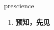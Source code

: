 
\begin{frame}
{\huge prescience}
\begin{center}
\begin{enumerate}\Large
  \item \textbf{预知，先见}
\end{enumerate}
\end{center}
\end{frame}
